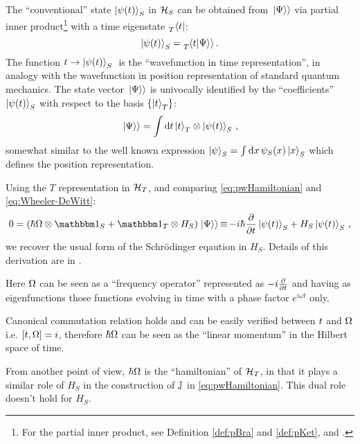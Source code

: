 The ``conventional'' state $\ket{\psi(t)}_S$ in $\mathcal{H}_S$
can be obtained from $\left.\left| \Psi \right\rangle\right\rangle$ via partial inner product\footnote{
  For the partial inner product,
  see Definition \ref{def:pBra} and \ref{def:pKet},
  and \cite[.3]{QMT_Jacobs}.
}
with a time eigenstate $\prescript{}{T}{\bra{t}}$:
\begin{equation*}
  \ket{\psi(t)}_S = \prescript{}{T}{\!\left.\left\langle t \middle| \Psi \right\rangle\right\rangle} \, \text{.}
\end{equation*}
The function $ t \rightarrow \ket{\psi(t)}_S \; $ is the
``wavefunction in time representation'', in analogy
with the wavefunction in position representation of standard quantum mechanics.
The state vector $\left.\left| \Psi \right\rangle\right\rangle$ is univocally identified by the ``coefficients'' $\ket{\psi(t)}_S$
with respect to the basis $\left\{\ket{t}_T\right\}$:
\begin{equation*}
  \left.\left| \Psi \right\rangle\right\rangle = \int \dd{t} \ket{t}_T \otimes \ket{\psi(t)}_S \, \text{,}
\end{equation*}
somewhat similar to the well known expression $\ket{\psi}_S = \int \dd{x} \psi_{S}(x) \ket{x}_S$
which defines the position representation.

Using the $T$ representation in $\mathcal{H}_T$,
and comparing \eqref{eq:pwHamiltonian} and \eqref{eq:Wheeler-DeWitt}:
\begin{equation}\label{eq:schrod_from_pw}
  0 = \qty(\hbar\op{\Omega}\ox\idop_S + \idop_{T}\ox\op{H}_S)\dket{\Psi}
    \repr -i\hbar\pdv{t}\ket{\psi(t)}_{S} + \op{H}_S\ket{\psi(t)}_{S}
    \,\text{,}
\end{equation}
we recover the usual form of the Schr\"{o}dinger eqaution in $H_S$.
Details of this derivation are in \cite{Wootters:Loyola}.

Here ${\Omega}$ can be seen as a ``frequency operator''
represented as $-i\pdv{t}$ and having as eigenfunctions
those functions evolving in time with a phase factor $e^{i \omega t}$ only.

Canonical commutation relation holds and can be easily verified
between ${t}$ and ${\Omega}$
i.e. $[{t}, {\Omega}] = i$,
therefore $\hbar{\Omega}$ can be seen as the ``linear momentum''
in the Hilbert space of time.

From another point of view, $\hbar{\Omega}$ is the ``hamiltonian'' of $\mathcal{H}_T$,
in that it plays a similar role of $H_S$ in the construction of
${\mathbb{J}}$ in \eqref{eq:pwHamiltonian}. This dual role doesn't hold
for $H_S$. 


